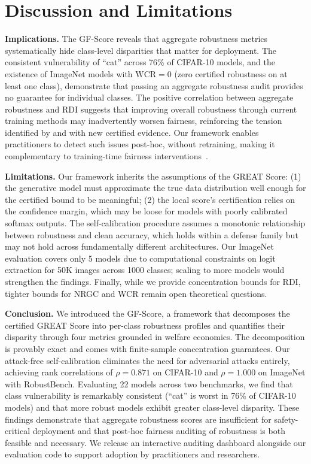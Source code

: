 \section{Discussion and Limitations}
\label{sec:discussion}

\textbf{Implications.} The GF-Score reveals that aggregate robustness metrics systematically hide class-level disparities that matter for deployment. The consistent vulnerability of ``cat'' across 76\% of CIFAR-10 models, and the existence of ImageNet models with $\mathrm{WCR} = 0$ (zero certified robustness on at least one class), demonstrate that passing an aggregate robustness audit provides no guarantee for individual classes. The positive correlation between aggregate robustness and RDI suggests that improving overall robustness through current training methods may inadvertently worsen fairness, reinforcing the tension identified by \citet{xu2021robustfairfairnessadversarial} and \citet{benz2021robustnessoddsfairnessempirical} with new certified evidence. Our framework enables practitioners to detect such issues post-hoc, without retraining, making it complementary to training-time fairness interventions~\citep{wei2023cfaclasswisecalibratedfair, zhang2024fairnessawareadversariallearning}.

\textbf{Limitations.} Our framework inherits the assumptions of the GREAT Score: (1) the generative model must approximate the true data distribution well enough for the certified bound to be meaningful; (2) the local score's certification relies on the confidence margin, which may be loose for models with poorly calibrated softmax outputs. The self-calibration procedure assumes a monotonic relationship between robustness and clean accuracy, which holds within a defense family but may not hold across fundamentally different architectures. Our ImageNet evaluation covers only 5 models due to computational constraints on logit extraction for 50K images across 1000 classes; scaling to more models would strengthen the findings. Finally, while we provide concentration bounds for RDI, tighter bounds for NRGC and WCR remain open theoretical questions.

\textbf{Conclusion.} We introduced the GF-Score, a framework that decomposes the certified GREAT Score into per-class robustness profiles and quantifies their disparity through four metrics grounded in welfare economics. The decomposition is provably exact and comes with finite-sample concentration guarantees. Our attack-free self-calibration eliminates the need for adversarial attacks entirely, achieving rank correlations of $\rho = 0.871$ on CIFAR-10 and $\rho = 1.000$ on ImageNet with RobustBench. Evaluating 22 models across two benchmarks, we find that class vulnerability is remarkably consistent (``cat'' is worst in 76\% of CIFAR-10 models) and that more robust models exhibit greater class-level disparity. These findings demonstrate that aggregate robustness scores are insufficient for safety-critical deployment and that post-hoc fairness auditing of robustness is both feasible and necessary. We release an interactive auditing dashboard alongside our evaluation code to support adoption by practitioners and researchers.
